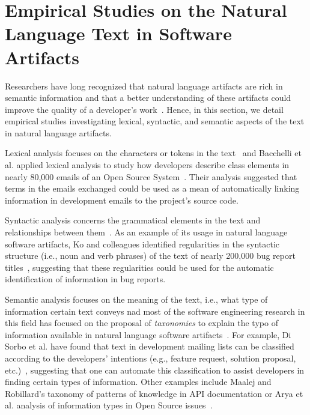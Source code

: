 



\section{Empirical Studies on the Natural Language Text in Software Artifacts}
\label{cp2:text-in-se}


Researchers have long recognized that natural language artifacts are rich in semantic information and that a better understanding of these artifacts could improve the quality of a developer's work~\cite{dekhtyar2004}.
Hence, in this section, we detail empirical studies investigating
lexical, syntactic, and semantic aspects of the text 
in 
natural language artifacts.






Lexical analysis focuses on the characters or tokens in the text~\cite{jurafsky2014speech}
and Bacchelli et al. applied lexical analysis to study how developers describe class elements
in nearly 80,000 emails of an Open Source System~\cite{bacchelli2009}.
Their analysis suggested that terms in the emails exchanged could be 
used as a mean of automatically linking information in development emails to 
the project's source code.






Syntactic analysis concerns the grammatical elements in the text 
and relationships between them~\cite{jurafsky2014speech}.
As an example of its usage in natural language software artifacts, 
Ko and colleagues identified regularities in the syntactic structure (i.e., noun and verb phrases) of the text 
of nearly 200,000 bug report titles~\cite{Ko2006}, suggesting that these 
regularities could be used for the automatic identification 
of information in bug reports. 




Semantic analysis focuses on the meaning of the text, i.e., what type of information 
certain text conveys nad most of the software engineering research in this field 
has focused on the proposal of \textit{taxonomies} to explain the typo of information 
available in natural language software artifacts~\cite{Maalej2013, Arya2019}. 
For example, Di Sorbo et al. have found that 
text in development mailing lists can be classified according to the developers' intentions (e.g., feature request, solution proposal, etc.)~\cite{Sorbo2015},
suggesting that one can automate this classification to assist developers in finding 
certain types of information.
Other examples include Maalej and Robillard's taxonomy of patterns of knowledge in API documentation
or Arya et al. analysis of information types in Open Source issues~\cite{Arya2019}.





